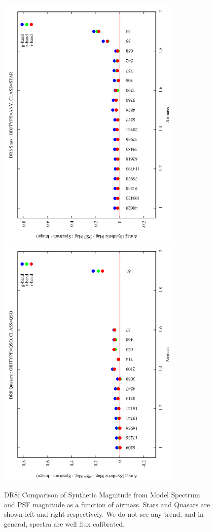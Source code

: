 \documentclass[apj,twocolumn]{aastex631}
\begin{document}
\begin{figure}%
\begin{center}
\label{fig:airmassvsmag}
\includegraphics[angle=270,width=8.9cm]{figures/120821_01_airmass_vs_dmag_star_dr8.png}
\includegraphics[angle=270,width=8.9cm]{figures/120821_04_airmass_vs_dmag_quasar_dr8.png}
\caption{DR8: Comparison of Synthetic Magnitude from Model Spectrum and PSF magnitude as a function of airmass. Stars and Quasars are shown left and right respectively.  We do not see any trend, and in general, spectra are well flux calibrated.}
\end{center}
\end{figure}
\end{document}
